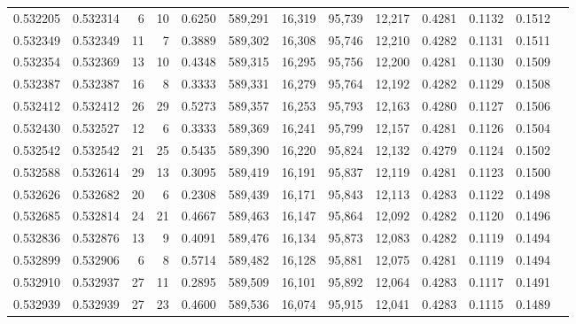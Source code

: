 \begin{tabular}{rrrrrrrrrrrrr}
0.532205 & 0.532314 &     6 &    10 &                                     0.6250 & 589,291 &  16,319 &  95,739 &  12,217 & 0.4281 & 0.1132 & 0.1512 \\
0.532349 & 0.532349 &    11 &     7 &                                     0.3889 & 589,302 &  16,308 &  95,746 &  12,210 & 0.4282 & 0.1131 & 0.1511 \\
0.532354 & 0.532369 &    13 &    10 &                                     0.4348 & 589,315 &  16,295 &  95,756 &  12,200 & 0.4281 & 0.1130 & 0.1509 \\
0.532387 & 0.532387 &    16 &     8 &                                     0.3333 & 589,331 &  16,279 &  95,764 &  12,192 & 0.4282 & 0.1129 & 0.1508 \\
0.532412 & 0.532412 &    26 &    29 &                                     0.5273 & 589,357 &  16,253 &  95,793 &  12,163 & 0.4280 & 0.1127 & 0.1506 \\
0.532430 & 0.532527 &    12 &     6 &                                     0.3333 & 589,369 &  16,241 &  95,799 &  12,157 & 0.4281 & 0.1126 & 0.1504 \\
0.532542 & 0.532542 &    21 &    25 &                                     0.5435 & 589,390 &  16,220 &  95,824 &  12,132 & 0.4279 & 0.1124 & 0.1502 \\
0.532588 & 0.532614 &    29 &    13 &                                     0.3095 & 589,419 &  16,191 &  95,837 &  12,119 & 0.4281 & 0.1123 & 0.1500 \\
0.532626 & 0.532682 &    20 &     6 &                                     0.2308 & 589,439 &  16,171 &  95,843 &  12,113 & 0.4283 & 0.1122 & 0.1498 \\
0.532685 & 0.532814 &    24 &    21 &                                     0.4667 & 589,463 &  16,147 &  95,864 &  12,092 & 0.4282 & 0.1120 & 0.1496 \\
0.532836 & 0.532876 &    13 &     9 &                                     0.4091 & 589,476 &  16,134 &  95,873 &  12,083 & 0.4282 & 0.1119 & 0.1494 \\
0.532899 & 0.532906 &     6 &     8 &                                     0.5714 & 589,482 &  16,128 &  95,881 &  12,075 & 0.4281 & 0.1119 & 0.1494 \\
0.532910 & 0.532937 &    27 &    11 &                                     0.2895 & 589,509 &  16,101 &  95,892 &  12,064 & 0.4283 & 0.1117 & 0.1491 \\
0.532939 & 0.532939 &    27 &    23 &                                     0.4600 & 589,536 &  16,074 &  95,915 &  12,041 & 0.4283 & 0.1115 & 0.1489 \\

\end{tabular}
